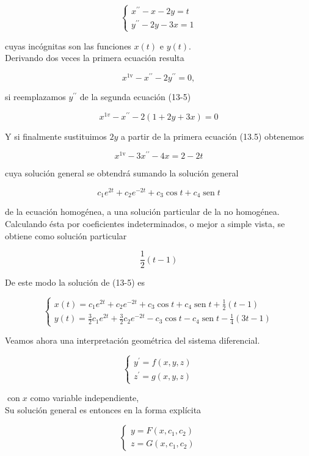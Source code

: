 \documentclass[10pt]{article}
\theoremstyle{plain}
\theoremstyle{definition}
\theoremstyle{remark}
\begin{document}
\[
\left\{\begin{array}{l}
x^{\prime \prime}-x-2 y=t  \tag{13-5}\\
y^{\prime \prime}-2 y-3 x=1
\end{array}\right.
\]

cuyas incógnitas son las funciones $x(t)$ e $y(t)$.\\
Derivando dos veces la primera ecuación resulta

$$
x^{1 \mathrm{v}}-x^{\prime \prime}-2 y^{\prime \prime}=0,
$$

si reemplazamos $y^{\prime \prime}$ de la segunda ecuación (13-5)


$$
x^{1 v}-x^{\prime \prime}-2(1+2 y+3 x)=0
$$

Y si finalmente sustituimos $2 y$ a partir de la primera ecuación (13.5) obtenemos

$$
x^{1 \mathrm{v}}-3 x^{\prime \prime}-4 x=2-2 t
$$

cuya solución general se obtendrá sumando la solución general

$$
c_{1} e^{2 t}+c_{2} e^{-2 t}+c_{3} \cos t+c_{4} \operatorname{sen} t
$$

de la ecuación homogénea, a una solución particular de la no homogénea. Calculando ésta por coeficientes indeterminados, o mejor a simple vista, se obtiene como solución particular

$$
\frac{1}{2}(t-1)
$$

De este modo la solución de (13-5) es

$$
\left\{\begin{array}{l}
x(t)=c_{1} e^{2 t}+c_{2} e^{-2 t}+c_{3} \cos t+c_{4} \operatorname{sen} t+\frac{1}{2}(t-1) \\
y(t)=\frac{3}{2} c_{1} e^{2 t}+\frac{3}{2} c_{2} e^{-2 t}-c_{3} \cos t-c_{4} \operatorname{sen} t-\frac{1}{4}(3 t-1)
\end{array}\right.
$$

Veamos ahora una interpretación geométrica del sistema diferencial.

$$
\left\{\begin{array}{l}
y^{\prime}=f(x, y, z) \\
z^{\prime}=g(x, y, z)
\end{array}\right.
$$

$\operatorname{con} x$ como variable independiente,\\
Su solución general es entonces en la forma explícita

$$
\left\{\begin{array}{l}
y=F\left(x, c_{1}, c_{2}\right) \\
z=G\left(x, c_{1}, c_{2}\right)
\end{array}\right.
$$
\end{document}
